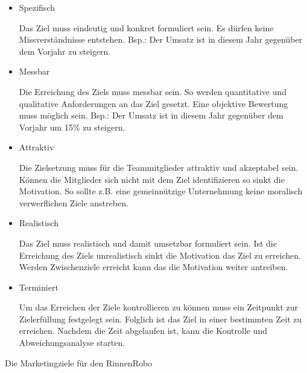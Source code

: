     \begin{itemize}
        \item Spezifisch
        
            Das Ziel muss eindeutig und konkret formuliert sein. Es dürfen keine Missverständnisse entstehen. Bsp.: 
            \as Der Umsatz ist in diesem Jahr gegenüber dem Vorjahr zu steigern.\ad

        \item Messbar

            Die Erreichung des Ziels muss messbar sein. So werden quantitative und qualitative Anforderungen an das Ziel
            gesetzt. Eine objektive Bewertung muss möglich sein. Bsp.: \as Der Umsatz ist in diesem Jahr gegenüber dem
            Vorjahr um 15\% zu steigern.\ad

        \item Attraktiv
        
            Die Zielsetzung muss für die Teammitglieder attraktiv und akzeptabel sein. Können die Mitglieder sich nicht
            mit dem Ziel identifizieren so sinkt die Motivation. So sollte z.B. eine gemeinnützige Unternehmung keine
            moralisch verwerflichen Ziele anstreben. 

        \item Realistisch
        
            Das Ziel muss realistisch und damit umsetzbar formuliert sein. Ist die Erreichung des Ziels unrealistisch
            sinkt die Motivation das Ziel zu erreichen. Werden Zwischenziele erreicht kann das die Motivation weiter
            antreiben.

        \item Terminiert
        
            Um das Erreichen der Ziele kontrollieren zu können muss ein Zeitpunkt zur Zielerfüllung festgelegt sein.
            Folglich ist das Ziel in einer bestimmten Zeit zu erreichen. Nachdem die Zeit abgelaufen ist, kann die
            Kontrolle und Abweichungsanalyse starten.
    \end{itemize}



    \noindent
    Die Marketingziele für den RinnenRobo

